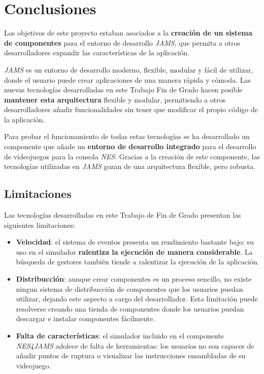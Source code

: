 \chapter{Conclusiones}\label{ch:conclusiones}

Los objetivos de este proyecto estaban asociados
a la \textbf{creación de un sistema de componentes}
para el entorno de desarrollo \textit{JAMS}, que permita
a otros desarrolladores expandir las características
de la aplicación.

\textit{JAMS} es un entorno de desarrollo moderno,
flexible, modular y fácil de utilizar, donde el usuario
puede crear aplicaciones de una manera rápida y cómoda.
Las nuevas tecnologías desarrolladas en este
Trabajo Fin de Grado hacen posible \textbf{mantener esta arquitectura}
flexible y modular, permitiendo a otros desarrolladores
añadir funcionalidades sin tener que modificar el propio
código de la aplicación.

Para probar el funcionamiento de todas estas tecnologías
se ha desarrollado un componente que añade un \textbf{entorno
de desarrollo integrado} para el desarrollo de videojuegos
para la consola \textit{NES}.
Gracias a la creación de este componente, las tecnologías
utilizadas en \textit{JAMS} gozan de una arquitectura
flexible, pero robusta.

\section{Limitaciones}\label{sec:limitaciones}

Las tecnologías desarrolladas en este Trabajo
de Fin de Grado presentan las siguientes limitaciones:

\begin{itemize}
    \item \textbf{Velocidad}: el sistema de eventos
    presenta un rendimiento bastante bajo: su uso
    en el simulador \textbf{ralentiza la ejecución
    de manera considerable}.
    La búsqueda de gestores también tiende a ralentizar
    la ejecución de la aplicación.
    \item \textbf{Distribucción}: aunque crear componentes
    es un proceso sencillo, no existe ningun sistema de
    distribucción de componentes que los usuarios puedan
    utilizar, dejando este aspecto a cargo del desarrollador.
    Esta limitación puede resolverse creando una tienda de
    componentes donde los usuarios puedan descargar e instalar
    componentes fácilmente.
    \item \textbf{Falta de características}: el simulador
    incluido en el componente \textit{NES4JAMS} adolece
    de falta de herramientas: los usuarios no son
    capaces de añadir puntos de ruptura o visualizar
    las instrucciones ensambladas de su videojuego.
\end{itemize}


